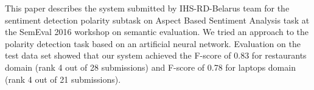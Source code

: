 This paper describes the system submitted by IHS-RD-Belarus team for the sentiment detection polarity subtask on Aspect Based Sentiment Analysis task at the SemEval 2016 workshop on semantic evaluation. We tried an approach to the polarity detection task based on an artificial neural network. Evaluation on the test data set showed that our system achieved the F-score of 0.83 for restaurants domain (rank 4 out of 28 submissions) and F-score of 0.78 for laptops domain (rank 4 out of 21 submissions).
